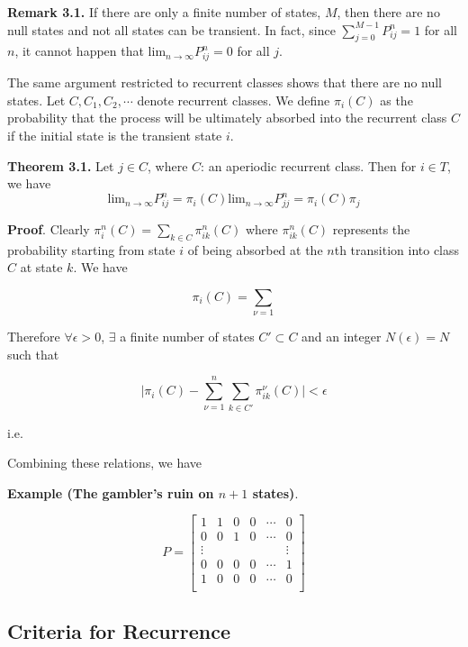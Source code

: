 \documentclass[12pt]{article}
\theoremstyle{nonumberbreak}
\begin{document}
\textbf{Remark 3.1.} If there are only a finite number of states, $M$, then there are no null states and not all states can be transient. In fact, since $\sum_{j=0}^{M-1} P_{ij}^n = 1$ for all $n$, it cannot happen that $\mathrm{lim}_{n\to\infty} P^n_{ij} = 0$ for all $j$.

The same argument restricted to recurrent classes shows that there are no null states. Let $C, C_1, C_2,\cdots$ denote recurrent classes. We define $\pi_i(C)$ as the probability that the process will be ultimately absorbed into the recurrent class $C$ if the initial state is the transient state $i$. 



\begin{theorem}
\textbf{Theorem 3.1.} Let $j \in C$, where $C$: an aperiodic recurrent class. Then for $i \in T$, we have
$$
\mathrm{lim}_{n\to\infty} P_{ij}^n = \pi_i(C) \mathrm{lim}_{n\to\infty} P_{jj}^n = \pi_i(C)\pi_j
$$
\end{theorem}



\textbf{Proof}. Clearly $\pi_i^n (C) = \sum_{k \in C} \pi_{ik}^n (C)$ where $\pi_{ik}^n(C)$ represents the probability starting from state $i$ of being absorbed at the $n$th transition into class $C$ at state $k$. We have

$$
\pi_i(C) = \sum_{\nu = 1 }
$$


Therefore $\forall \epsilon >0$, $\exists$ a finite number of states $C' \subset C$ and an integer $N(\epsilon) = N$ such that 

$$
\vert \pi_i(C) - \sum_{\nu=1}^n \sum_{k \in C'} \pi_{ik}^\nu (C) \vert < \epsilon
$$

i.e.



Combining these relations, we have 


\textbf{Example (The gambler's ruin on $n+1$ states)}. 




$$
P = \begin{bmatrix}
1 & 1 & 0 & 0 & \cdots & 0 \\
0 & 0 & 1 & 0 & \cdots & 0 \\
\vdots &  &  &  &  & \vdots \\
0 & 0 & 0 & 0 & \cdots & 1 \\
1 & 0 & 0 & 0 & \cdots & 0 \\
\end{bmatrix}
$$



\subsection{Criteria for Recurrence}
\end{document}
